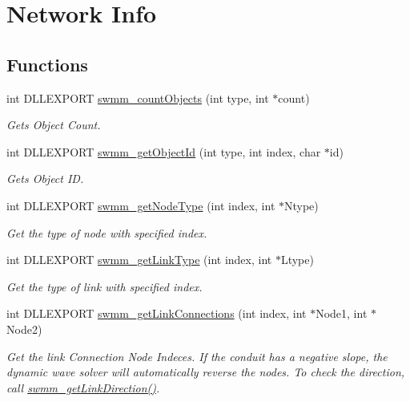 \hypertarget{group___network_info}{}\section{Network Info}
\label{group___network_info}
\subsection*{Functions}
\begin{DoxyCompactItemize}
\item 
int D\+L\+L\+E\+X\+P\+O\+RT \hyperlink{group___network_info_gae1abeab9f6ff81750c80460e48f5dd20}{swmm\+\_\+count\+Objects} (int type, int $\ast$count)
\begin{DoxyCompactList}\small\item\em Gets Object Count. \end{DoxyCompactList}\item 
int D\+L\+L\+E\+X\+P\+O\+RT \hyperlink{group___network_info_ga8bad91e436bc64458cf0958b722781a0}{swmm\+\_\+get\+Object\+Id} (int type, int index, char $\ast$id)
\begin{DoxyCompactList}\small\item\em Gets Object ID. \end{DoxyCompactList}\item 
int D\+L\+L\+E\+X\+P\+O\+RT \hyperlink{group___network_info_gae66a64aee207928c902cb399222cf418}{swmm\+\_\+get\+Node\+Type} (int index, int $\ast$Ntype)
\begin{DoxyCompactList}\small\item\em Get the type of node with specified index. \end{DoxyCompactList}\item 
int D\+L\+L\+E\+X\+P\+O\+RT \hyperlink{group___network_info_gacf4d0ca8a3ced3c1b8797f3f09fff1d0}{swmm\+\_\+get\+Link\+Type} (int index, int $\ast$Ltype)
\begin{DoxyCompactList}\small\item\em Get the type of link with specified index. \end{DoxyCompactList}\item 
int D\+L\+L\+E\+X\+P\+O\+RT \hyperlink{group___network_info_gaebf8dfaeb171add70860fbdd99f768be}{swmm\+\_\+get\+Link\+Connections} (int index, int $\ast$Node1, int $\ast$Node2)
\begin{DoxyCompactList}\small\item\em Get the link Connection Node Indeces. If the conduit has a negative slope, the dynamic wave solver will automatically reverse the nodes. To check the direction, call \hyperlink{group___network_info_gac390c83be7f7f0e2cd9c6f1126a226aa}{swmm\+\_\+get\+Link\+Direction()}. \end{DoxyCompactList}\item 

\end{DoxyCompactItemize}
